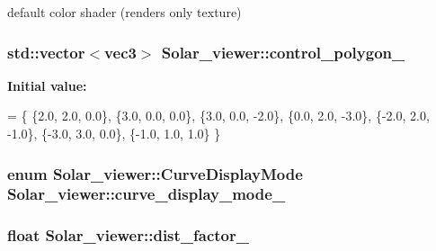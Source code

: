 default color shader (renders only texture) 

\subsubsection[{\texorpdfstring{control\+\_\+polygon\+\_\+}{control_polygon_}}]{\setlength{\rightskip}{0pt plus 5cm}std\+::vector$<${\bf vec3}$>$ Solar\+\_\+viewer\+::control\+\_\+polygon\+\_\+\hspace{0.3cm}{\ttfamily [private]}}\hypertarget{classSolar__viewer_a67aa3b5cdacc2c7f2947ad2d72c6ce32}{}\label{classSolar__viewer_a67aa3b5cdacc2c7f2947ad2d72c6ce32}
{\bfseries Initial value\+:}
\begin{DoxyCode}
= \{
        \{2.0, 2.0, 0.0\},
        \{3.0, 0.0, 0.0\},
        \{3.0, 0.0, -2.0\},
        \{0.0, 2.0, -3.0\},
        \{-2.0, 2.0, -1.0\},
        \{-3.0, 3.0, 0.0\},
        \{-1.0, 1.0, 1.0\}
    \}
\end{DoxyCode}
\subsubsection[{\texorpdfstring{curve\+\_\+display\+\_\+mode\+\_\+}{curve_display_mode_}}]{\setlength{\rightskip}{0pt plus 5cm}enum {\bf Solar\+\_\+viewer\+::\+Curve\+Display\+Mode}  Solar\+\_\+viewer\+::curve\+\_\+display\+\_\+mode\+\_\+\hspace{0.3cm}{\ttfamily [private]}}\hypertarget{classSolar__viewer_a42bdd7e9bad9f049ae3c9d8dcb8f40ec}{}\label{classSolar__viewer_a42bdd7e9bad9f049ae3c9d8dcb8f40ec}
\subsubsection[{\texorpdfstring{dist\+\_\+factor\+\_\+}{dist_factor_}}]{\setlength{\rightskip}{0pt plus 5cm}float Solar\+\_\+viewer\+::dist\+\_\+factor\+\_\+\hspace{0.3cm}{\ttfamily [private]}}\hypertarget{classSolar__viewer_a7447e4773978c9391a2ab54a52b92b43}{}\label{classSolar__viewer_a7447e4773978c9391a2ab54a52b92b43}



